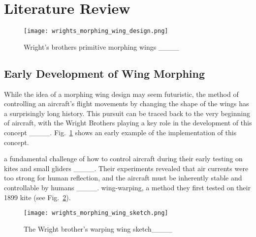 \section{Literature Review}
\label{sec:related_work}



\begin{figure}
    \centering
    \texttt{[image: wrights\_morphing\_wing\_design.png]}
    \caption{Wright’s brothers primitive morphing wings ____}
    \label{fig:wrights_morphing_wing_design}
\end{figure}

\subsection{Early Development of Wing Morphing}
While the idea of a morphing wing design may seem futuristic, the method of controlling an aircraft's flight movements by changing the shape of the wings has a surprisingly long history. This pursuit can be traced back to the very beginning of aircraft, with the Wright Brothers playing a key role in the development of this concept ____. Fig.~\ref{fig:wrights_morphing_wing_design} shows an early example of the implementation of this concept. 

 a fundamental challenge of how to control aircraft during their early testing on kites and small gliders ____. Their experiments revealed that air currents were too strong for human reflection, and the aircraft must be inherently stable and controllable by humans ____.  wing-warping, a method they first tested on their 1899 kite (see Fig.~\ref{fig:wrights_morphing_wing_sketch}). 



\begin{figure}[h!]
    \centering
    \texttt{[image: wrights\_morphing\_wing\_sketch.png]}
    \caption{The Wright brother’s warping wing sketch____}
    \label{fig:wrights_morphing_wing_sketch}
\end{figure}


